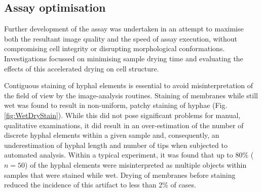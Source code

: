\subsection{Assay optimisation}

Further development of the assay was undertaken in an attempt to maximise both the resultant image quality and the speed of assay execution, without compromising cell integrity or disrupting morphological conformations. Investigations focussed on minimising sample drying time and evaluating the effects of this accelerated drying on cell structure.

Contiguous staining of hyphal elements is essential to avoid misinterpretation of the field of view by the image-analysis routines. Staining of membranes while still wet was found to result in non-uniform, patchy staining of hyphae (Fig.\ref{fig:WetDryStain}). While this did not pose significant problems for manual, qualitative examinations, it did result in an over-estimation of the number of discrete hyphal elements within a given sample and, consequently, an underestimation of hyphal length and number of tips when subjected to automated analysis. Within a typical experiment, it was found that up to 80\% ($n = 50$) of the hyphal elements were misinterpreted as multiple objects within samples that were stained while wet. Drying of membranes before staining reduced the incidence of this artifact to less than 2\% of cases.

